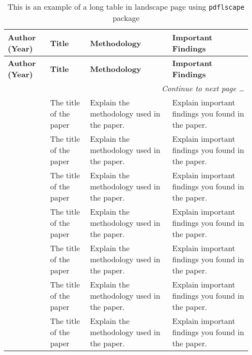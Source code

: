 \begin{landscape}
	\singlespacing
	\renewcommand{\arraystretch}{1.2}	%
	\begin{longtable}{m{} m{} m{} m{}}
		\caption{This is an example of a long table in landscape page using \texttt{pdflscape} package \label{tab:longtablelandscape}}	\\[2pc]	%
		\toprule[1.2pt]
		\textbf{Author (Year)} & \textbf{Title} & \textbf{Methodology} & \textbf{Important Findings} \\ 	
		\midrule
		\endfirsthead	%
		\toprule[1.2pt]
		\textbf{Author (Year)} & \textbf{Title} & \textbf{Methodology} & \textbf{Important Findings} \\ 	
		\midrule
		\endhead %
		\bottomrule \multicolumn{4}{r}{\textit{\footnotesize Continue to next page \ldots}} \\
		\endfoot	%
		\bottomrule[1.2pt]
		\endlastfoot
		\citet{latex:companion} & The title of the paper & Explain the methodology used in the paper. & Explain important findings you found in the paper. \\[12pt]
		\citet{othman2019effect}  & The title of the paper & Explain the methodology used in the paper. & Explain important findings you found in the paper. \\
		\citet{wanna2018fracture}  & The title of the paper & Explain the methodology used in the paper. & Explain important findings you found in the paper. \\
		\citet{matsom:template}  & The title of the paper & Explain the methodology used in the paper. & Explain important findings you found in the paper. \\
		\citet{othman2019effect}  & The title of the paper & Explain the methodology used in the paper. & Explain important findings you found in the paper. \\
		\citet{wanna2018fracture} & The title of the paper & Explain the methodology used in the paper. & Explain important findings you found in the paper. \\
		\citet{latex:companion}  & The title of the paper & Explain the methodology used in the paper. & Explain important findings you found in the paper. \\[12pt]

\end{longtable}
\end{landscape}
